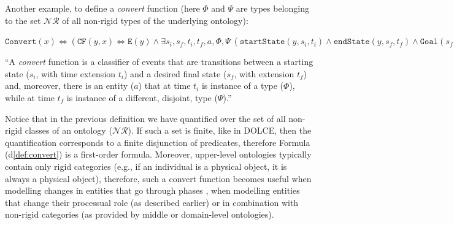 \documentclass[sw]{iosart2x}
\newcommand{\bflist}{\begin{list}{}{\setlength{\topsep}{2mm}\setlength{\partopsep}{0mm}\setlength{\parsep}{0mm}\setlength{\leftmargin}{9mm}\setlength{\labelwidth}{8mm}}}
\newcommand{\eflist}{\end{list}}
\newcommand{\DefLabel}{\textrm{d}}
\newcounter{cntdef}
\newcommand{\mydf}[1]{\refstepcounter{cntdef}\begin{small}{\bf \DefLabel\thecntdef\label{def:#1}}\end{small}}
\newcommand{\mytext}[1]{``#1''}
\newcommand{\refdf}[1]{({\DefLabel}\ref{#1})}
\newcommand{\generalStyle}[1]{\texttt{#1}}
\newcommand{\biRel}[3]{\generalStyle{#1}(#2,#3)}
\newcommand{\uniRel}[2]{\generalStyle{#1}(#2)}
\newcommand{\triRel}[4]{\generalStyle{#1}(#2,#3,#4)}
\newcommand{\myiff}{\Longleftrightarrow}
\newcommand{\DOLCE}{\textsc{DOLCE}\xspace} %
\newcommand{\DOLCEEvent}[1]{\uniRel{{E}}{#1}}
\newcommand{\DOLCEPC}[3]{\triRel{{PC}}{#1}{#2}{#3}}
\newcommand{\DOLCECLbyBinary}[2]{\biRel{CF}{#1}{#2}}
\newcommand{\Goal}[1]{\uniRel{Goal}{#1}}
\newcommand{\Convert}[1]{\uniRel{Convert}{#1}}
\newcommand{\sState}[3]{\triRel{startState}{#1}{#2}{#3}}
\newcommand{\eState}[3]{\triRel{endState}{#1}{#2}{#3}}
\begin{document}
Another example, to define a \textit{convert} function (here $\Phi$ and $\Psi$ are types belonging to the set $\mathcal{NR}$ of all non-rigid types of the underlying ontology): 
\bflist
  \item[\mydf{convert}] $ \Convert{x} \myiff (\DOLCECLbyBinary{y}{x} \myiff \DOLCEEvent{y} \land \exists s_i,s_f,t_i,t_f,a,\Phi,\Psi~(\sState{y}{s_i}{t_i} \land \eState{y}{s_f}{t_f} \land \Goal{s_f} \land \Phi\in\mathcal{NR} \land \Psi\in\mathcal{NR} \land \Psi\cap\Phi = \emptyset \land  \DOLCEPC{a}{s_i}{t_i} \land \DOLCEPC{a}{s_f}{t_f} \land \Phi(a,t_i) \land \Psi(a,t_f))) $ 
  \item[] \mytext{A \textit{convert} function is a classifier of events that are transitions between a starting state ($s_i$, with time extension $t_i$) and a desired final state ($s_f$, with extension $t_f$) and, moreover, there is an entity ($a$) that at time $t_i$ is instance of a type ($\Phi$), while at time $t_f$ is instance of a different, disjoint, type ($\Psi$).}
\eflist 
Notice that in the previous definition we have quantified over the set of all non-rigid classes of an ontology ($\mathcal{NR}$). 
If such a set is finite, like in \DOLCE, then the quantification corresponds to a finite disjunction of predicates, therefore Formula \refdf{def:convert} is a first-order formula.
Moreover, upper-level ontologies typically contain only rigid categories (e.g., if an individual is a physical object, it is always a physical object), therefore, such a convert function becomes useful when modelling changes in entities that go through phases \cite{guarinoOverviewOntoClean2009}, when modelling entities that change their processual role (as described earlier) or in combination with non-rigid categories (as provided by middle or domain-level ontologies).
\end{document}
